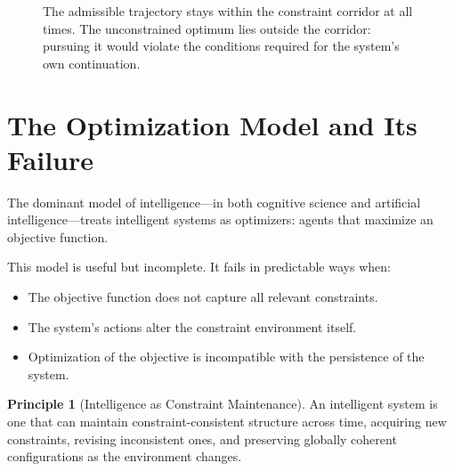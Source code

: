 \documentclass[11pt]{book}
\theoremstyle{plain}
\theoremstyle{definition}
\newtheorem{principle}[theorem]{Principle}
\theoremstyle{remark}
\begin{document}
\begin{figure}[h]
\centering
{}
\caption{The admissible trajectory stays within the constraint corridor at all times.
The unconstrained optimum lies outside the corridor: pursuing it would violate the
conditions required for the system's own continuation.}
\end{figure}

\section{The Optimization Model and Its Failure}

The dominant model of intelligence---in both cognitive science and artificial
intelligence---treats intelligent systems as optimizers: agents that maximize
an objective function.

This model is useful but incomplete. It fails in predictable ways when:
\begin{itemize}
  \item The objective function does not capture all relevant constraints.
  \item The system's actions alter the constraint environment itself.
  \item Optimization of the objective is incompatible with the persistence
        of the system.
\end{itemize}

\begin{principle}[Intelligence as Constraint Maintenance]
An intelligent system is one that can maintain constraint-consistent
structure across time, acquiring new constraints, revising inconsistent
ones, and preserving globally coherent configurations as the environment
changes.
\end{principle}
\end{document}
